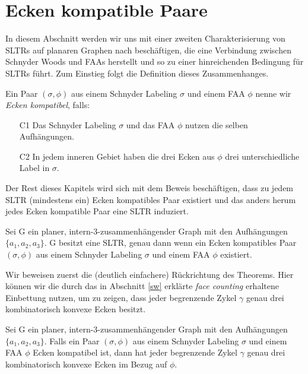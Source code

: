 \section{Ecken kompatible Paare}

In diesem Abschnitt werden wir uns mit einer zweiten Charakterisierung von SLTRs auf planaren Graphen nach \cite{af15} beschäftigen, die eine Verbindung zwischen Schnyder Woods und FAAs herstellt und so zu einer hinreichenden Bedingung für SLTRs führt. Zum Einstieg folgt die Definition dieses Zusammenhanges.

\begin{definition}\label{def_ccc}
Ein Paar $(\sigma,\phi)$ aus einem Schnyder Labeling $\sigma$ und einem FAA $\phi$ nenne wir \textit{Ecken kompatibel}, falls:
\begin{itemize}
\item [C1] Das Schnyder Labeling $\sigma$ und das FAA $\phi$ nutzen die selben Aufhängungen.
\item [C2] In jedem inneren Gebiet haben die drei Ecken aus $\phi$ drei unterschiedliche Label in $\sigma$.
\end{itemize}
\end{definition}

Der Rest dieses Kapitels wird sich mit dem Beweis beschäftigen, dass zu jedem SLTR (mindestens ein) Ecken kompatibles Paar existiert und das anders herum jedes Ecken kompatible Paar eine SLTR induziert.

\begin{theorem}
\label{theo_ccc}
Sei G ein planer, intern-3-zusammenhängender Graph mit den Aufhängungen $\{a_1,a_2,a_3\}$. G besitzt eine SLTR, genau dann wenn ein Ecken kompatibles Paar $(\sigma,\phi)$ aus einem Schnyder Labeling $\sigma$ und einem FAA $\phi$ existiert.
\end{theorem}

Wir beweisen zuerst die (deutlich einfachere) Rückrichtung des Theorems. Hier können wir die durch das in Abschnitt \ref{sw} erklärte \textit{face counting} erhaltene Einbettung nutzen, um zu zeigen, dass jeder begrenzende Zykel $\gamma$ genau drei kombinatorisch konvexe Ecken besitzt. 

\begin{lemma}\label{lem1}
Sei G ein planer, intern-3-zusammenhängender Graph mit den Aufhängungen $\{a_1,a_2,a_3\}$. Falls ein Paar $(\sigma,\phi)$ aus einem Schnyder Labeling $\sigma$ und einem FAA $\phi$ Ecken kompatibel ist, dann hat jeder begrenzende Zykel $\gamma$ genau drei kombinatorisch konvexe Ecken im Bezug auf $\phi$.
\end{lemma}

